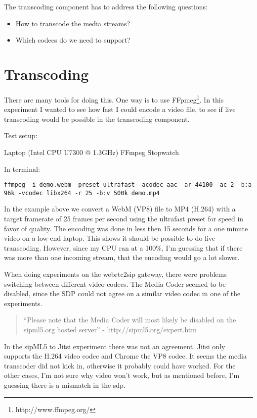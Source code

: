 The transcoding component has to address the following questions:

\begin{itemize}
\item{How to transcode the media streams?}
\item{Which codecs do we need to support?}
\end{itemize}

\section{Transcoding}
There are many tools for doing this. One way is to use FFpmeg\footnote{http://www.ffmpeg.org/}. In this experiment I wanted to see how fast I could encode a video file, to see if live transcoding would be possible in the transcoding component.

Test setup:
\begin{itemize}
Laptop (Intel CPU U7300 @ 1.3GHz)
FFmpeg
Stopwatch
\end{itemize}

In terminal:
\begin{lstlisting}
ffmpeg -i demo.webm -preset ultrafast -acodec aac -ar 44100 -ac 2 -b:a 96k -vcodec libx264 -r 25 -b:v 500k demo.mp4
\end{lstlisting}

In the example above we convert a WebM (VP8) file to MP4 (H.264) with a target framerate of 25 frames per second using the ultrafast preset for speed in favor of quality. The encoding was done in less then 15 seconds for a one minute video on a low-end laptop. This shows it should be possible to do live transcoding. However, since my CPU ran at a 100\%, I'm guessing that if there was more than one incoming stream, that the encoding would go a lot slower.

When doing experiments on the webrtc2sip gateway, there were problems switching between different video codecs. The Media Coder seemed to be disabled, since the SDP could not agree on a similar video codec in one of the experiments.

\begin{quote}
``Please note that the Media Coder will most likely be disabled on the sipml5.org hosted server'' - http://sipml5.org/expert.htm
\end{quote}

In the sipML5 to Jitsi experiment there was not an agreement. Jitsi only supports the H.264 video codec and Chrome the VP8 codec. It seems the media transcoder did not kick in, otherwise it probably could have worked. For the other cases, I'm not sure why video won't work, but as mentioned before, I'm guessing there is a mismatch in the \gls{sdp}.

